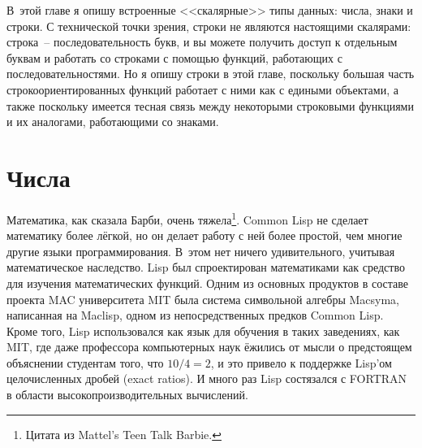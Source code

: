 В~этой главе я опишу встроенные <<скалярные>> типы данных: числа, знаки и строки.  С
технической точки зрения, строки не являются настоящими скалярами: строка~--
последовательность букв, и вы можете получить доступ к отдельным буквам и работать со
строками с помощью функций, работающих с последовательностями.  Но я опишу строки в этой
главе, поскольку большая часть строкоориентированных функций работает с ними как с
едиными объектами, а также поскольку имеется тесная связь между некоторыми строковыми
функциями и их аналогами, работающими со знаками.

\section{Числа}

Математика, как сказала Барби, очень тяжела\footnote{Цитата из Mattel's Teen Talk Barbie.}.
Common Lisp не сделает математику более лёгкой, но он делает работу с ней более простой,
чем многие другие языки программирования.  В~этом нет ничего удивительного, учитывая
математическое наследство.  Lisp был спроектирован математиками как средство для изучения
математических функций.  Одним из основных продуктов в составе проекта MAC университета
MIT была система символьной алгебры Macsyma, написанная на Maclisp, одном из
непосредственных предков Common Lisp.  Кроме того, Lisp использовался как язык для
обучения в таких заведениях, как MIT, где даже профессора компьютерных наук ёжились от
мысли о предстоящем объяснении студентам того, что $10/4 = 2$, и это привело к поддержке
Lisp'ом целочисленных дробей (exact ratios).  И много раз Lisp состязался с FORTRAN в
области высокопроизводительных вычислений.

